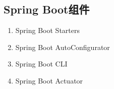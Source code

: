 \documentclass[../../../interview-questions.tex]{subfiles}
\begin{document}
\subsection{Spring Boot组件}

\begin{enumerate}
    \item {Spring Boot Starters}
    \item {Spring Boot AutoConfigurator}
    \item {Spring Boot CLI}
    \item {Spring Boot Actuator}
\end{enumerate}
\end{document}
